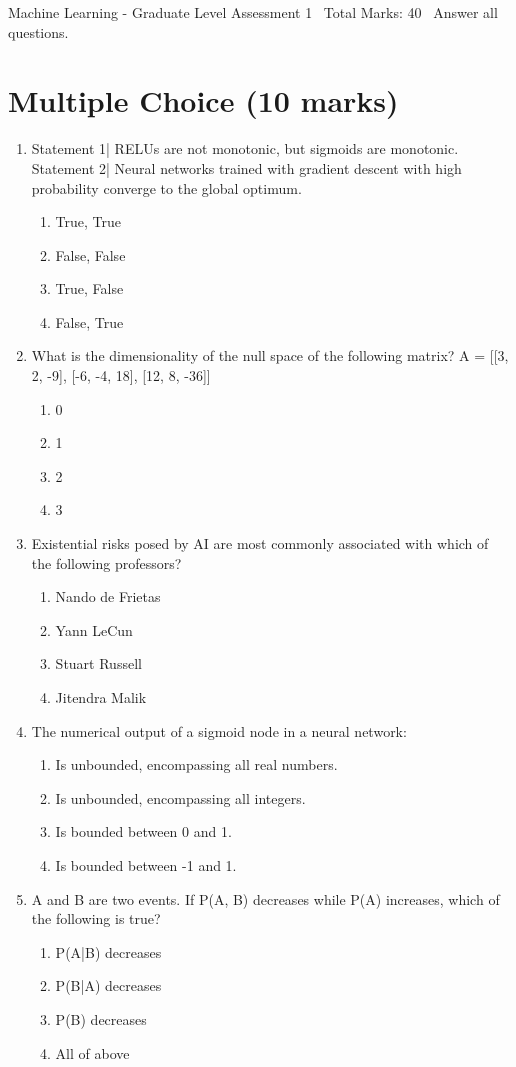 \documentclass[12pt]{article}
\begin{document}
\begin{center}
Machine Learning - Graduate Level Assessment 1 \
Total Marks: 40 \
Answer all questions.
\end{center}

\section*{Multiple Choice (10 marks)}
\begin{enumerate}[label=\arabic*.]
\item Statement 1| RELUs are not monotonic, but sigmoids are monotonic. Statement 2| Neural networks trained with gradient descent with high probability converge to the global optimum.
\begin{enumerate}[label=(\alph*)]
    \item True, True
    \item False, False
    \item True, False
    \item False, True
\end{enumerate}
\item What is the dimensionality of the null space of the following matrix? A = [[3, 2, -9], [-6, -4, 18], [12, 8, -36]]
\begin{enumerate}[label=(\alph*)]
    \item 0
    \item 1
    \item 2
    \item 3
\end{enumerate}
\item Existential risks posed by AI are most commonly associated with which of the following professors?
\begin{enumerate}[label=(\alph*)]
    \item Nando de Frietas
    \item Yann LeCun
    \item Stuart Russell
    \item Jitendra Malik
\end{enumerate}
\item The numerical output of a sigmoid node in a neural network:
\begin{enumerate}[label=(\alph*)]
    \item Is unbounded, encompassing all real numbers.
    \item Is unbounded, encompassing all integers.
    \item Is bounded between 0 and 1.
    \item Is bounded between -1 and 1.
\end{enumerate}
\item A and B are two events. If P(A, B) decreases while P(A) increases, which of the following is true?
\begin{enumerate}[label=(\alph*)]
    \item P(A|B) decreases
    \item P(B|A) decreases
    \item P(B) decreases
    \item All of above
\end{enumerate}
\end{enumerate}
\end{document}
